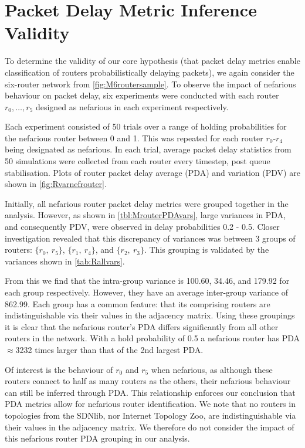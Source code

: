 \section{Packet Delay Metric Inference Validity}
\label{sec:MPDMinferencevalid}
To determine the validity of our core hypothesis (that packet delay metrics enable classification of routers probabilistically delaying packets), we again consider the six-router network from \cref{fig:M6routersample}. To observe the impact of nefarious behaviour on packet delay, six experiments were conducted with each router $r_0,\dots, r_5$ designed as nefarious in each experiment respectively.\par
Each experiment consisted of 50 trials over a range of holding probabilities for the nefarious router between 0 and 1. This was repeated for each router $r_0$-$r_4$ being designated as nefarious. In each trial, average packet delay statistics from 50 simulations were collected from each router every timestep, post queue stabilisation. Plots of router packet delay average (PDA) and variation (PDV) are shown in \cref{fig:Rvarnefrouter}.\par
Initially, all nefarious router packet delay metrics were grouped together in the analysis. However, as shown in \cref{tbl:MrouterPDAvars}, large variances in PDA, and consequently PDV, were observed in delay probabilities 0.2 - 0.5. Closer investigation revealed that this discrepancy of variances was between 3 groups of routers: $\{r_0,\ r_5\}$, $\{r_1,\ r_4\}$, and $\{r_2,\ r_3\}$. This grouping is validated by the variances shown in \cref{tab:Rallvars}.\par
From this we find that the intra-group variance is 100.60, 34.46, and 179.92 for each group respectively. However, they have an average inter-group variance of 862.99. Each group has a common feature: that its comprising routers are indistinguishable via their values in the adjacency matrix. Using these groupings it is clear that the nefarious router's PDA differs significantly from all other routers in the network. With a hold probability of 0.5 a nefarious router has PDA $\approx$3232 times larger than that of the 2nd largest PDA.\par
Of interest is the behaviour of $r_0$ and $r_5$ when nefarious, as although these routers connect to half as many routers as the others, their nefarious behaviour can still be inferred through PDA. This relationship enforces our conclusion that PDA metrics allow for nefarious router identification. We note that no routers in topologies from the SDNlib, nor Internet Topology Zoo, are indistinguishable via their values in the adjacency matrix. We therefore do not consider the impact of this nefarious router PDA grouping in our analysis.\par
